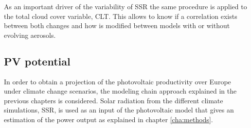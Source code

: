 
As an important driver of the variability of SSR the same procedure is applied to the total cloud cover variable, CLT. This allows to know if a correlation exists between both changes and how is modified between models with or without evolving aerosols.





\subsection{PV potential}

In order to obtain a projection of the photovoltaic productivity over Europe under climate change scenarios, the modeling chain approach explained in the previous chapters is considered. Solar radiation from the different climate simulations, SSR, is used as an input of the photovoltaic model that gives an estimation of the power output as explained in chapter \ref{cha:methods}.


